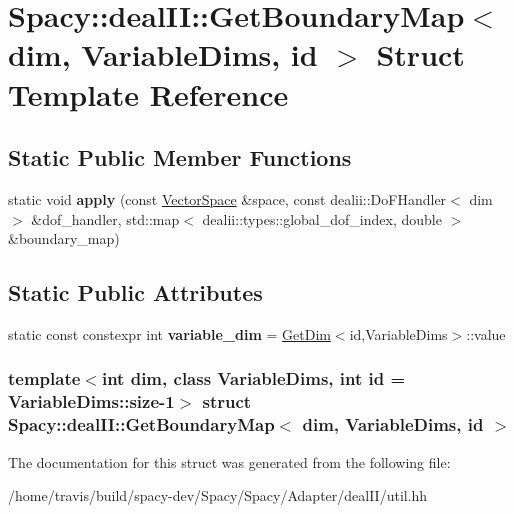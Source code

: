 \hypertarget{structSpacy_1_1dealII_1_1GetBoundaryMap}{\section{\-Spacy\-:\-:deal\-I\-I\-:\-:\-Get\-Boundary\-Map$<$ dim, \-Variable\-Dims, id $>$ \-Struct \-Template \-Reference}
\label{structSpacy_1_1dealII_1_1GetBoundaryMap}
}
\subsection*{\-Static \-Public \-Member \-Functions}
\begin{DoxyCompactItemize}
\item 
\hypertarget{structSpacy_1_1dealII_1_1GetBoundaryMap_a350717743d86b49614a002522b83988a}{static void {\bfseries apply} (const \hyperlink{classSpacy_1_1VectorSpace}{\-Vector\-Space} \&space, const dealii\-::\-Do\-F\-Handler$<$ dim $>$ \&dof\-\_\-handler, std\-::map$<$ dealii\-::types\-::global\-\_\-dof\-\_\-index, double $>$ \&boundary\-\_\-map)}\label{structSpacy_1_1dealII_1_1GetBoundaryMap_a350717743d86b49614a002522b83988a}

\end{DoxyCompactItemize}
\subsection*{\-Static \-Public \-Attributes}
\begin{DoxyCompactItemize}
\item 
\hypertarget{structSpacy_1_1dealII_1_1GetBoundaryMap_afab4389c174cb85c5b1440585fe56e6d}{static const constexpr int {\bfseries variable\-\_\-dim} = \hyperlink{structSpacy_1_1dealII_1_1GetDim}{\-Get\-Dim}$<$id,\-Variable\-Dims$>$\-::value}\label{structSpacy_1_1dealII_1_1GetBoundaryMap_afab4389c174cb85c5b1440585fe56e6d}

\end{DoxyCompactItemize}
\subsubsection*{template$<$int dim, class Variable\-Dims, int id = \-Variable\-Dims\-::size-\/1$>$ struct Spacy\-::deal\-I\-I\-::\-Get\-Boundary\-Map$<$ dim, Variable\-Dims, id $>$}



\-The documentation for this struct was generated from the following file\-:\begin{DoxyCompactItemize}
\item 
/home/travis/build/spacy-\/dev/\-Spacy/\-Spacy/\-Adapter/deal\-I\-I/util.\-hh\end{DoxyCompactItemize}
